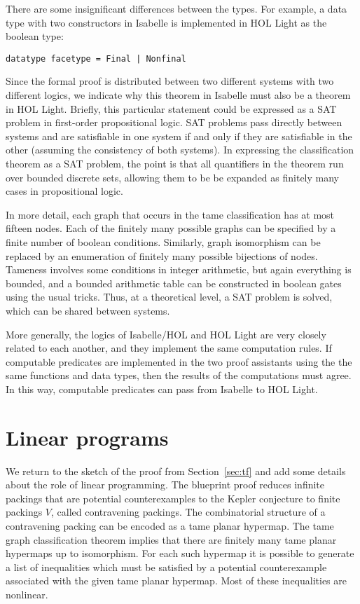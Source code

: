 There are some insignificant differences between the types.  For
example, a data type with two constructors in Isabelle
is implemented in HOL Light as the boolean type:
\begin{lstlisting}[keepspaces=true,stringstyle=\tt,basicstyle=\small,%
frame=none,framesep=8pt,mathescape,morekeywords={and,shows},columns=flexible]
datatype facetype = Final | Nonfinal
\end{lstlisting}


Since the formal proof is distributed between two different systems
with two different logics, we indicate why this theorem in
Isabelle must also be a theorem in HOL Light.  Briefly, this
particular statement could be expressed as a SAT problem in
first-order propositional logic.  SAT problems pass directly between
systems and are satisfiable in one system if and only if they are
satisfiable in the other (assuming the consistency of both systems).
In expressing the classification theorem as a SAT problem, the point
is that all quantifiers in the theorem run over bounded discrete sets,
allowing them to be be expanded as finitely many cases in
propositional logic.

In more detail, each graph that occurs in the tame classification has
at most fifteen nodes.  Each of the finitely many possible graphs
can be specified by a finite number of boolean conditions.  Similarly,
graph isomorphism can be replaced by an enumeration of finitely many
possible bijections of nodes.  Tameness involves some conditions in
integer arithmetic, but again everything is bounded, and a bounded
arithmetic table can be constructed in boolean gates using the usual
tricks.  Thus, at a theoretical level, a SAT problem is solved, which
can be shared between systems.

More generally, the logics of Isabelle/HOL and HOL Light are very
closely related to each another, and they implement the same
computation rules.  If computable predicates are implemented in the
two proof assistants using the the same functions and data types, then
the results of the computations must agree.  In this way, computable
predicates can pass from Isabelle to HOL Light.


\section{Linear programs}\label{sec:lp}

We return to the sketch of the proof from Section~\ref{sec:tf} and add
some details about the role of linear programming.  The blueprint
proof reduces infinite packings that are potential counterexamples to
the Kepler conjecture to finite packings $V$, called contravening
packings. The combinatorial structure of a contravening packing can be
encoded as a tame planar hypermap. The tame graph classification
theorem implies that there are finitely many tame planar hypermaps up
to isomorphism. For each such hypermap it is possible to generate a
list of inequalities which must be satisfied by a potential
counterexample associated with the given tame planar hypermap. Most of
these inequalities are nonlinear.

